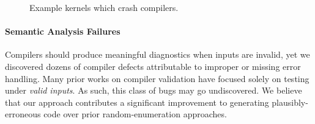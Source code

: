 \begin{figure}
  \centering %
  \\%
  \\%
  \\%
  \\%
  \\%
  \caption{Example kernels which crash compilers.}%
\end{figure}
 
\paragraph{Semantic Analysis Failures} %
Compilers should produce meaningful diagnostics when inputs are invalid, yet we discovered dozens of compiler defects attributable to improper or missing error handling. Many prior works on compiler validation have focused solely on testing under \emph{valid inputs}. As such, this class of bugs may go undiscovered. We believe that our approach contributes a significant improvement to generating plausibly-erroneous code over prior random-enumeration approaches.

